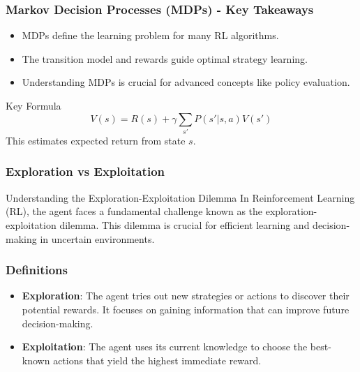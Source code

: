 \documentclass[aspectratio=169]{beamer}
\begin{document}
\begin{frame}[fragile]
    \frametitle{Markov Decision Processes (MDPs) - Key Takeaways}
    \begin{itemize}
        \item MDPs define the learning problem for many RL algorithms.
        \item The transition model and rewards guide optimal strategy learning.
        \item Understanding MDPs is crucial for advanced concepts like policy evaluation.
    \end{itemize}
    \begin{block}{Key Formula}
        \begin{equation}
            V(s) = R(s) + \gamma \sum_{s'} P(s' | s, a) V(s')
        \end{equation}
        This estimates expected return from state $s$.
    \end{block}
\end{frame}

\begin{frame}[fragile]
    \frametitle{Exploration vs Exploitation}
    \begin{block}{Understanding the Exploration-Exploitation Dilemma}
        In Reinforcement Learning (RL), the agent faces a fundamental challenge known as the exploration-exploitation dilemma. This dilemma is crucial for efficient learning and decision-making in uncertain environments.
    \end{block}
\end{frame}

\begin{frame}[fragile]
    \frametitle{Definitions}
    \begin{itemize}
        \item \textbf{Exploration}: The agent tries out new strategies or actions to discover their potential rewards. It focuses on gaining information that can improve future decision-making.
        
        \item \textbf{Exploitation}: The agent uses its current knowledge to choose the best-known actions that yield the highest immediate reward.
    \end{itemize}
\end{frame}
\end{document}
